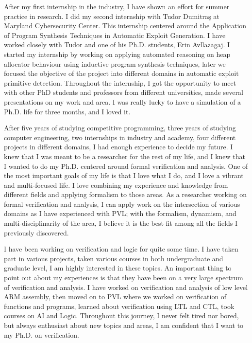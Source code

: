 \documentclass{letter}
\begin{document}
\begin{letter}{}
After my first internship in the industry, I have shown an effort for summer practice in research. I did my second internship with Tudor Dumitraş at Maryland Cybersecurity Center. This internship centered around the Application of Program Synthesis Techniques in Automatic Exploit Generation. I have worked closely with Tudor and one of his Ph.D. students, Erin Avllazagaj. I started my internship by working on applying automated reasoning on heap allocator behaviour using inductive program synthesis techniques, later we focused the objective of the project into different domains in automatic exploit primitive detection. Throughout the internship, I got the opportunity to meet with other PhD students and professors from different universities, made several presentations on my work and area. I was really lucky to have a simulation of a Ph.D. life for three months, and I loved it. 

After five years of studying competitive programming, three years of studying computer engineering, two internships in industry and academy, four different projects in different domains, I had enough experience to decide my future. I knew that I was meant to be a researcher for the rest of my life, and I knew that I wanted to do my Ph.D. centered around formal verification and analysis. One of the most important goals of my life is that I love what I do, and I love a vibrant and multi-focused life. I love combining my experience and knowledge from different fields and applying formalism to those areas. As a researcher working on formal verification and analysis, I can apply work on the intersection of various domains as I have experienced with PVL; with the formalism, dynamism, and multi-disciplinarity of the area, I believe it is the best fit among all the fields I previously discovered. 

I have been working on verification and logic for quite some time. I have taken part in various projects, taken various courses in both undergraduate and graduate level, I am highly interested in these topics. An important thing to point out about my experiences is that they have been on a very large spectrum of verification and analysis. I have worked on verification and analysis of low level ARM assembly, then moved on to PVL where we worked on verification of functions and programs, learned about verification using LTL and CTL, took courses on AI and Logic. Throughout this journey, I never felt tired nor bored, but always enthusiast about new topics and areas, I am confident that I want to my Ph.D. on verification. 


\end{letter}
\end{document}
